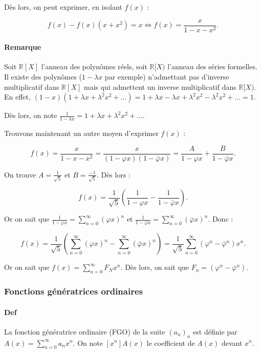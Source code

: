 \documentclass{article}
\begin{document}
			Dès lors, on peut exprimer, en isolant $f(x)$ :

			\[f(x)  - f(x)(x+x^2) = x \iff f(x) = \frac x{1-x-x^2}.\]

			\paragraph{Remarque} Soit $\mathbb R[X]$ l'anneau des polynômes réels, soit $\mathbb R[X)$ l'anneau des séries formelles. Il existe des polynômes ($1-\lambda x$ par exemple) n'admettant
			pas d'inverse multiplicatif dans $\mathbb R[X]$ mais qui admettent un inverse multiplicatif dans $\mathbb R[X)$. En effet, $(1-x)(1 + \lambda x + \lambda^2x^2 + \ldots) =
			1 + \lambda x - \lambda x + \lambda^2 x^2 - \lambda^2 x^2 + \ldots = 1$.

			Dès lors, on note $\frac 1{1-\lambda x} = 1+\lambda x+\lambda^2 x^2+\ldots$.

			Trouvons maintenant un autre moyen d'exprimer $f(x)$ :

			\[f(x) = \frac x{1-x-x^2} = \frac x{(1-\varphi x)(1 - \bar\varphi x)} = \frac A{1-\varphi x} + \frac B{1-\bar\varphi x}.\]

			On trouve $A = \frac 1{\sqrt 5}$ et $B = \frac {-1}{\sqrt 5}$. Dès lors :

			\[f(x) = \frac 1{\sqrt 5} \left(\frac 1{1-\varphi x} - \frac 1{1-\bar\varphi x}\right).\]

			Or on sait que $\frac 1{1-\varphi x} = \sum_{n=0}^\infty (\varphi x)^n$ et $\frac 1{1-\bar\varphi x} = \sum_{n=0}^\infty(\bar\varphi x)^n$. Donc :

			\[f(x) = \frac 1{\sqrt 5}\left(\sum_{n=0}^\infty(\varphi x)^n - \sum_{n=0}^\infty(\bar\varphi x)^n\right) = \frac 1{\sqrt 5}\sum_{n=0}^\infty(\varphi^n - \bar\varphi^n)x^n.\]
			
			Or on sait que $f(x) = \sum_{n=0}^\infty F_Nx^n$. Dès lors, on sait que $F_n = (\varphi^n - \bar\varphi^n)$.

			\subsubsection{Fonctions génératrices ordinaires}

			\paragraph{Def} La fonction génératrice ordinaire (FGO) de la suite $(a_n)_n$ est définie par $A(x) = \sum_{n=0}^\infty a_nx^n$. On note $[x^n]A(x)$ le coefficient de $A(x)$ devant $x^n$.
\end{document}
